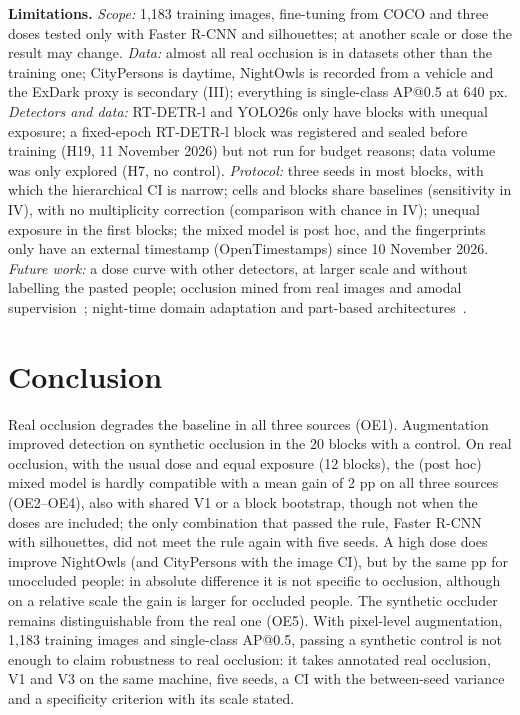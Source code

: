\documentclass[conference]{IEEEtran}
\begin{document}
\textbf{Limitations.} \emph{Scope:} 1,183 training images, fine-tuning from COCO and three doses tested only with Faster R-CNN and silhouettes; at another scale or dose the result may change. \emph{Data:} almost all real occlusion is in datasets other than the training one; CityPersons is daytime, NightOwls is recorded from a vehicle and the ExDark proxy is secondary (III); everything is single-class AP@0.5 at 640 px. \emph{Detectors and data:} RT-DETR-l and YOLO26s only have blocks with unequal exposure; a fixed-epoch RT-DETR-l block was registered and sealed before training (H19, 11 November 2026) but not run for budget reasons; data volume was only explored (H7, no control). \emph{Protocol:} three seeds in most blocks, with which the hierarchical CI is narrow; cells and blocks share baselines (sensitivity in IV), with no multiplicity correction (comparison with chance in IV); unequal exposure in the first blocks; the mixed model is post hoc, and the fingerprints only have an external timestamp (OpenTimestamps) since 10 November 2026. \emph{Future work:} a dose curve with other detectors, at larger scale and without labelling the pasted people; occlusion mined from real images and amodal supervision~\cite{Reddy2022walt}; night-time domain adaptation and part-based architectures~\cite{Wang2020compnet}.

\section{Conclusion}
Real occlusion degrades the baseline in all three sources (OE1). Augmentation improved detection on synthetic occlusion in the 20 blocks with a control. On real occlusion, with the usual dose and equal exposure (12 blocks), the (post hoc) mixed model is hardly compatible with a mean gain of 2 pp on all three sources (OE2--OE4), also with shared V1 or a block bootstrap, though not when the doses are included; the only combination that passed the rule, Faster R-CNN with silhouettes, did not meet the rule again with five seeds. A high dose does improve NightOwls (and CityPersons with the image CI), but by the same pp for unoccluded people: in absolute difference it is not specific to occlusion, although on a relative scale the gain is larger for occluded people. The synthetic occluder remains distinguishable from the real one (OE5). With pixel-level augmentation, 1,183 training images and single-class AP@0.5, passing a synthetic control is not enough to claim robustness to real occlusion: it takes annotated real occlusion, V1 and V3 on the same machine, five seeds, a CI with the between-seed variance and a specificity criterion with its scale stated.
\end{document}
